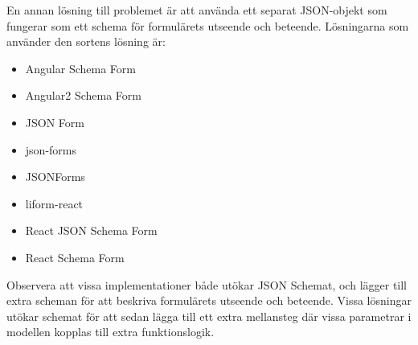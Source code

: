 En annan lösning till problemet är att använda ett separat JSON-objekt som fungerar som ett schema för formulärets utseende och beteende. Lösningarna som använder den sortens lösning är:
\begin{itemize}
	\item Angular Schema Form \cite{Textalk}
	\item Angular2 Schema Form \cite{MakinaCorpus}
	\item JSON Form \cite{Joshfire}
	\item json-forms \cite{Brutusin.org}
	\item JSONForms \cite{EclipseSource}
	\item liform-react \cite{NachoMartin}
	\item React JSON Schema Form \cite{MozillaServices}
	\item React Schema Form \cite{NetworkNewTechnologiesInc.}
\end{itemize}

Observera att vissa implementationer både utökar JSON Schemat, och lägger till extra scheman för att beskriva formulärets utseende och beteende. Vissa lösningar utökar schemat för att sedan lägga till ett extra mellansteg där vissa parametrar i modellen kopplas till extra funktionslogik.